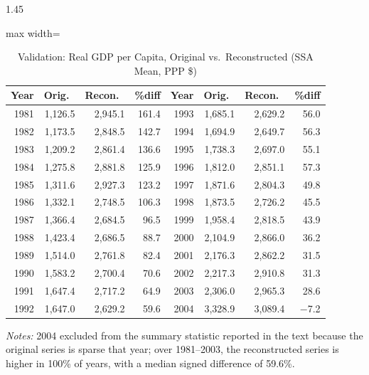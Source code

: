 \documentclass[12pt]{article}
\begin{document}
\begin{bibunit}[jpe]
\begin{spacing}{1.45}
\begin{table}[H]
\centering
\begin{adjustbox}{max width=\textwidth}
\begin{threeparttable}
\caption{Validation: Real GDP per Capita, Original vs.\ Reconstructed (SSA Mean, PPP \$)}
\label{tab:B5}
\begin{tabular}{rrrr|rrrr}
\toprule
Year & Orig.\ & Recon.\ & \%diff & Year & Orig.\ & Recon.\ & \%diff \\
\midrule
1981 & 1{,}126.5 & 2{,}945.1 & 161.4 & 1993 & 1{,}685.1 & 2{,}629.2 & 56.0 \\
1982 & 1{,}173.5 & 2{,}848.5 & 142.7 & 1994 & 1{,}694.9 & 2{,}649.7 & 56.3 \\
1983 & 1{,}209.2 & 2{,}861.4 & 136.6 & 1995 & 1{,}738.3 & 2{,}697.0 & 55.1 \\
1984 & 1{,}275.8 & 2{,}881.8 & 125.9 & 1996 & 1{,}812.0 & 2{,}851.1 & 57.3 \\
1985 & 1{,}311.6 & 2{,}927.3 & 123.2 & 1997 & 1{,}871.6 & 2{,}804.3 & 49.8 \\
1986 & 1{,}332.1 & 2{,}748.5 & 106.3 & 1998 & 1{,}873.5 & 2{,}726.2 & 45.5 \\
1987 & 1{,}366.4 & 2{,}684.5 & 96.5  & 1999 & 1{,}958.4 & 2{,}818.5 & 43.9 \\
1988 & 1{,}423.4 & 2{,}686.5 & 88.7  & 2000 & 2{,}104.9 & 2{,}866.0 & 36.2 \\
1989 & 1{,}514.0 & 2{,}761.8 & 82.4  & 2001 & 2{,}176.3 & 2{,}862.2 & 31.5 \\
1990 & 1{,}583.2 & 2{,}700.4 & 70.6  & 2002 & 2{,}217.3 & 2{,}910.8 & 31.3 \\
1991 & 1{,}647.4 & 2{,}717.2 & 64.9  & 2003 & 2{,}306.0 & 2{,}965.3 & 28.6 \\
1992 & 1{,}647.0 & 2{,}629.2 & 59.6  & 2004 & 3{,}328.9 & 3{,}089.4 & $-$7.2 \\
\bottomrule
\end{tabular}
\begin{tablenotes}[flushleft]
\footnotesize
\item \textit{Notes:} 2004 excluded from the summary statistic reported in the text because the original series is sparse that year; over 1981--2003, the reconstructed series is higher in 100\% of years, with a median signed difference of 59.6\%.
\end{tablenotes}
\end{threeparttable}
\end{adjustbox}
\end{table}


\end{spacing}
\end{bibunit}
\end{document}
